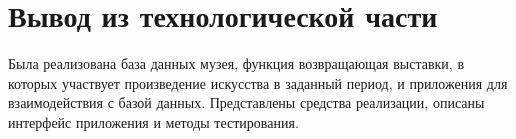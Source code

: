 \section*{Вывод из технологической части}
Была реализована база данных музея, функция возвращающая выставки, в которых участвует произведение искусства в заданный период, и приложения для взаимодействия с базой данных. Представлены средства реализации, описаны интерфейс приложения и методы тестирования.
\clearpage
